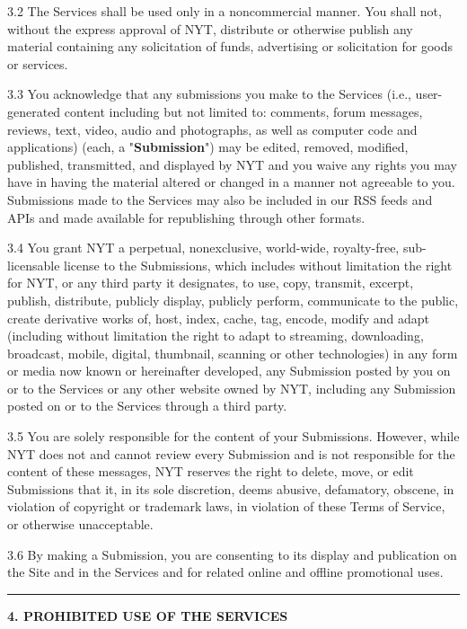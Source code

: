 3.2 The Services shall be used only in a noncommercial manner. You shall
not, without the express approval of NYT, distribute or otherwise
publish any material containing any solicitation of funds, advertising
or solicitation for goods or services.

3.3 You acknowledge that any submissions you make to the Services (i.e.,
user-generated content including but not limited to: comments, forum
messages, reviews, text, video, audio and photographs, as well as
computer code and applications) (each, a "\textbf{Submission}") may be
edited, removed, modified, published, transmitted, and displayed by NYT
and you waive any rights you may have in having the material altered or
changed in a manner not agreeable to you. Submissions made to the
Services may also be included in our RSS feeds and APIs and made
available for republishing through other formats.

3.4 You grant NYT a perpetual, nonexclusive, world-wide, royalty-free,
sub-licensable license to the Submissions, which includes without
limitation the right for NYT, or any third party it designates, to use,
copy, transmit, excerpt, publish, distribute, publicly display, publicly
perform, communicate to the public, create derivative works of, host,
index, cache, tag, encode, modify and adapt (including without
limitation the right to adapt to streaming, downloading, broadcast,
mobile, digital, thumbnail, scanning or other technologies) in any form
or media now known or hereinafter developed, any Submission posted by
you on or to the Services or any other website owned by NYT, including
any Submission posted on or to the Services through a third party.

3.5 You are solely responsible for the content of your Submissions.
However, while NYT does not and cannot review every Submission and is
not responsible for the content of these messages, NYT reserves the
right to delete, move, or edit Submissions that it, in its sole
discretion, deems abusive, defamatory, obscene, in violation of
copyright or trademark laws, in violation of these Terms of Service, or
otherwise unacceptable.

3.6 By making a Submission, you are consenting to its display and
publication on the Site and in the Services and for related online and
offline promotional uses.

\begin{center}\rule{0.5\linewidth}{\linethickness}\end{center}

\textbf{4. PROHIBITED USE OF THE SERVICES}

